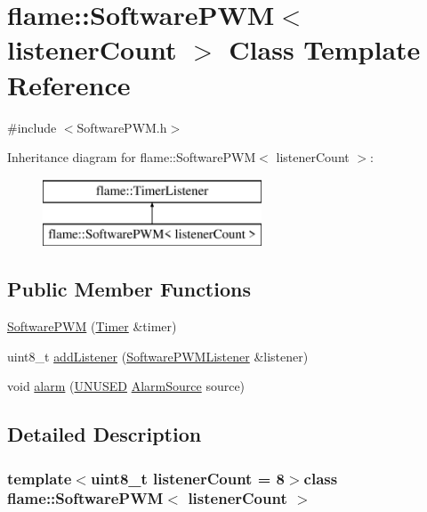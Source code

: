\hypertarget{classflame_1_1_software_p_w_m}{\section{flame\-:\-:Software\-P\-W\-M$<$ listener\-Count $>$ Class Template Reference}
\label{classflame_1_1_software_p_w_m}
}


{\ttfamily \#include $<$Software\-P\-W\-M.\-h$>$}

Inheritance diagram for flame\-:\-:Software\-P\-W\-M$<$ listener\-Count $>$\-:\begin{figure}[H]
\begin{center}
\leavevmode
\includegraphics[height=2.000000cm]{classflame_1_1_software_p_w_m}
\end{center}
\end{figure}
\subsection*{Public Member Functions}
\begin{DoxyCompactItemize}
\item 
\hyperlink{classflame_1_1_software_p_w_m_a1221e93371787565449622704de2debf}{Software\-P\-W\-M} (\hyperlink{classflame_1_1_timer}{Timer} \&timer)
\item 
uint8\-\_\-t \hyperlink{classflame_1_1_software_p_w_m_a4a8a61037e62b7e2349c5513bf96771f}{add\-Listener} (\hyperlink{classflame_1_1_software_p_w_m_listener}{Software\-P\-W\-M\-Listener} \&listener)
\item 
void \hyperlink{classflame_1_1_software_p_w_m_ae128de439f29b8bb877e5a74d24e3ec3}{alarm} (\hyperlink{io_8h_addf5ec070e9499d36b7f2009ce736076}{U\-N\-U\-S\-E\-D} \hyperlink{namespaceflame_a6d176ba245556716fd3e32006bb7cfe5}{Alarm\-Source} source)
\end{DoxyCompactItemize}


\subsection{Detailed Description}
\subsubsection*{template$<$uint8\-\_\-t listener\-Count = 8$>$class flame\-::\-Software\-P\-W\-M$<$ listener\-Count $>$}



